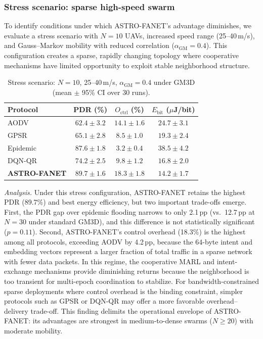 \documentclass[5p,times]{elsarticle}
\begin{document}
\subsubsection{Stress scenario: sparse high-speed swarm}
\label{subsec:stress}

To identify conditions under which ASTRO-FANET's advantage diminishes, we evaluate a stress scenario with $N=10$ UAVs, increased speed range (25--40\,m/s), and Gauss--Markov mobility with reduced correlation ($\alpha_{\mathrm{GM}}=0.4$). This configuration creates a sparse, rapidly changing topology where cooperative mechanisms have limited opportunity to exploit stable neighborhood structure.

\begin{table}[t]
\centering
\caption{Stress scenario: $N=10$, 25--40\,m/s, $\alpha_{\mathrm{GM}}=0.4$ under GM3D (mean $\pm$ 95\% CI over 30 runs).}
\label{tab:stress}
\scriptsize
\begin{tabular}{lccc}
\toprule
Protocol & PDR (\%) & $O_{\mathrm{ctrl}}$ (\%) & $E_{\mathrm{bit}}$ ($\mu$J/bit) \\
\midrule
AODV & $62.4 \pm 3.2$ & $14.1 \pm 1.6$ & $24.7 \pm 3.1$ \\
GPSR & $65.1 \pm 2.8$ & $8.5 \pm 1.0$ & $19.3 \pm 2.4$ \\
Epidemic & $87.6 \pm 1.8$ & $3.2 \pm 0.4$ & $38.5 \pm 4.2$ \\
DQN-QR & $74.2 \pm 2.5$ & $9.8 \pm 1.2$ & $16.8 \pm 2.0$ \\
\textbf{ASTRO-FANET} & $\mathbf{89.7 \pm 1.6}$ & $18.3 \pm 1.8$ & $\mathbf{14.2 \pm 1.7}$ \\
\bottomrule
\end{tabular}
\end{table}

\textit{Analysis.} Under this stress configuration, ASTRO-FANET retains the highest PDR (89.7\%) and best energy efficiency, but two important trade-offs emerge. First, the PDR gap over epidemic flooding narrows to only 2.1\,pp (vs.\ 12.7\,pp at $N=30$ under standard GM3D), and this difference is not statistically significant ($p = 0.11$). Second, ASTRO-FANET's control overhead (18.3\%) is the highest among all protocols, exceeding AODV by 4.2\,pp, because the 64-byte intent and embedding vectors represent a larger fraction of total traffic in a sparse network with fewer data packets. In this regime, the cooperative MARL and intent-exchange mechanisms provide diminishing returns because the neighborhood is too transient for multi-epoch coordination to stabilize. For bandwidth-constrained sparse deployments where control overhead is the binding constraint, simpler protocols such as GPSR or DQN-QR may offer a more favorable overhead--delivery trade-off. This finding delimits the operational envelope of ASTRO-FANET: its advantages are strongest in medium-to-dense swarms ($N \geq 20$) with moderate mobility.
\end{document}
